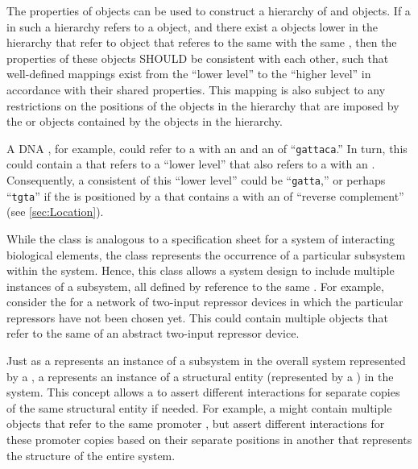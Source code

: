The  properties of  objects can be used to construct a hierarchy of  and  objects.
If a  in such a hierarchy refers to a  object, and there exist a  objects lower in the hierarchy that refer to  object that referes to the same  with the same , then the  properties of these  objects SHOULD be consistent with each other, such that well-defined mappings exist from the ``lower level''  to the ``higher level''  in accordance with their shared  properties. This mapping is also subject to any restrictions on the positions of the  objects in the hierarchy that are imposed by the  or  objects contained by the  objects in the hierarchy.

A DNA , for example, could refer to a  with an   and an   of ``{\tt gattaca}.'' In turn, this  could contain a  that refers to a ``lower level''   that also refers to a  with an  . Consequently, a consistent   of this ``lower level''  could be ``{\tt gatta},'' or perhaps ``{\tt tgta}'' if the  is positioned by a  that contains a   with an  of ``reverse complement'' (see \ref{sec:Location}).

While the  class is analogous to a specification sheet for a system of interacting biological elements, the  class represents the occurrence of a particular subsystem within the system.
Hence, this class allows a system design to include multiple instances of a subsystem, all defined by reference to the same .
For example, consider the  for a network of two-input repressor devices in which the particular repressors have not been chosen yet. This  could contain multiple  objects that refer to the same  of an abstract two-input repressor device.

Just as a  represents an instance of a subsystem in the overall system represented by a  , a  represents an instance of a structural entity (represented by a ) in the system. This concept allows a  to assert different interactions for separate copies of the same structural entity if needed. For example, a  might contain multiple   objects that refer to the same promoter , but assert different interactions for these promoter copies based on their separate positions in another  that represents the structure of the entire system.

